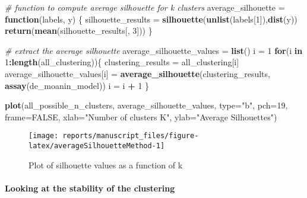 \documentclass[9pt,a4paper,]{extarticle}
\newenvironment{Shaded}{\begin{snugshade}}{\end{snugshade}}
\newcommand{\CommentTok}[1]{\textcolor[rgb]{0.56,0.35,0.01}{\textit{#1}}}
\newcommand{\ControlFlowTok}[1]{\textcolor[rgb]{0.13,0.29,0.53}{\textbf{#1}}}
\newcommand{\DataTypeTok}[1]{\textcolor[rgb]{0.13,0.29,0.53}{#1}}
\newcommand{\DecValTok}[1]{\textcolor[rgb]{0.00,0.00,0.81}{#1}}
\newcommand{\KeywordTok}[1]{\textcolor[rgb]{0.13,0.29,0.53}{\textbf{#1}}}
\newcommand{\NormalTok}[1]{#1}
\newcommand{\OperatorTok}[1]{\textcolor[rgb]{0.81,0.36,0.00}{\textbf{#1}}}
\newcommand{\OtherTok}[1]{\textcolor[rgb]{0.56,0.35,0.01}{#1}}
\newcommand{\StringTok}[1]{\textcolor[rgb]{0.31,0.60,0.02}{#1}}
\begin{document}
\begin{Shaded}
\begin{Highlighting}[]
\CommentTok{# function to compute average silhouette for k clusters}
\NormalTok{average_silhouette =}\StringTok{ }\ControlFlowTok{function}\NormalTok{(labels, y) \{}
\NormalTok{    silhouette_results =}\StringTok{ }\KeywordTok{silhouette}\NormalTok{(}\KeywordTok{unlist}\NormalTok{(labels[}\DecValTok{1}\NormalTok{]),}\KeywordTok{dist}\NormalTok{(y))}
    \KeywordTok{return}\NormalTok{(}\KeywordTok{mean}\NormalTok{(silhouette_results[, }\DecValTok{3}\NormalTok{]))}
\NormalTok{\}}

\CommentTok{# extract the average silhouette}
\NormalTok{average_silhouette_values =}\StringTok{ }\KeywordTok{list}\NormalTok{()}
\NormalTok{i =}\StringTok{ }\DecValTok{1}
\ControlFlowTok{for}\NormalTok{(i }\ControlFlowTok{in} \DecValTok{1}\OperatorTok{:}\KeywordTok{length}\NormalTok{(all_clustering))\{}
\NormalTok{    clustering_results =}\StringTok{ }\NormalTok{all_clustering[i]}
\NormalTok{    average_silhouette_values[i] =}\StringTok{ }\KeywordTok{average_silhouette}\NormalTok{(clustering_results,}
        \KeywordTok{assay}\NormalTok{(de_moanin_model))}
\NormalTok{    i =}\StringTok{ }\NormalTok{i }\OperatorTok{+}\StringTok{ }\DecValTok{1}
\NormalTok{\}}

\KeywordTok{plot}\NormalTok{(all_possible_n_clusters, average_silhouette_values,}
     \DataTypeTok{type=}\StringTok{"b"}\NormalTok{, }\DataTypeTok{pch=}\DecValTok{19}\NormalTok{, }\DataTypeTok{frame=}\OtherTok{FALSE}\NormalTok{,}
     \DataTypeTok{xlab=}\StringTok{"Number of clusters K"}\NormalTok{,}
     \DataTypeTok{ylab=}\StringTok{"Average Silhouettes"}\NormalTok{)}
\end{Highlighting}
\end{Shaded}

\begin{figure}[H]

{\centering \texttt{[image: reports/manuscript\_files/figure-latex/averageSilhouetteMethod-1]} 

}

\caption{Plot of silhouette values as a function of k}\label{fig:averageSilhouetteMethod}
\end{figure}

\hypertarget{looking-at-the-stability-of-the-clustering}{%
\paragraph{Looking at the stability of the clustering}\label{looking-at-the-stability-of-the-clustering}}
\end{document}
